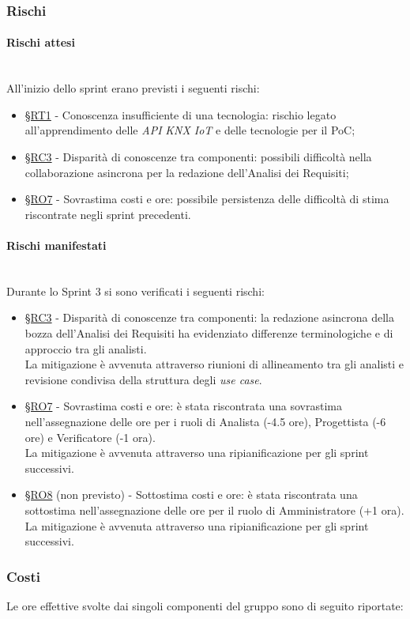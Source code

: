 \documentclass[10pt, letterpaper]{article}
\newcommand{\trisubsection}[1]{\paragraph{#1}\mbox{}\\}
\newcommand{\rif}[1]{\hyperref[#1]{§#1}}
\begin{document}
\subsubsection{Rischi}
\trisubsection{Rischi attesi}
All'inizio dello sprint erano previsti i seguenti rischi:
\begin{itemize}
    \item \rif{RT1} - Conoscenza insufficiente di una tecnologia: rischio legato all'apprendimento delle \textit{API} \textit{KNX IoT} e delle tecnologie per il PoC;
    \item \rif{RC3} - Disparità di conoscenze tra componenti: possibili difficoltà nella collaborazione asincrona per la redazione dell'Analisi dei Requisiti;
    \item \rif{RO7} - Sovrastima costi e ore: possibile persistenza delle difficoltà di stima riscontrate negli sprint precedenti.
\end{itemize}

\trisubsection{Rischi manifestati}
Durante lo Sprint 3 si sono verificati i seguenti rischi:
\begin{itemize}
    \item \rif{RC3} - Disparità di conoscenze tra componenti: la redazione asincrona della bozza dell'Analisi dei Requisiti ha evidenziato differenze terminologiche e di approccio tra gli analisti.
          \\La mitigazione è avvenuta attraverso riunioni di allineamento tra gli analisti e revisione condivisa della struttura degli \textit{use case}.
    \item \rif{RO7} - Sovrastima costi e ore: è stata riscontrata una sovrastima nell'assegnazione delle ore per i ruoli di Analista (-4.5 ore), Progettista (-6 ore) e Verificatore (-1 ora).
          \\La mitigazione è avvenuta attraverso una ripianificazione per gli sprint successivi.
    \item \rif{RO8} (non previsto) - Sottostima costi e ore: è stata riscontrata una sottostima nell'assegnazione delle ore per il ruolo di Amministratore (+1 ora).
          \\La mitigazione è avvenuta attraverso una ripianificazione per gli sprint successivi.
\end{itemize}

\subsubsection{Costi}
Le ore effettive svolte dai singoli componenti del gruppo sono di seguito riportate:
\end{document}
